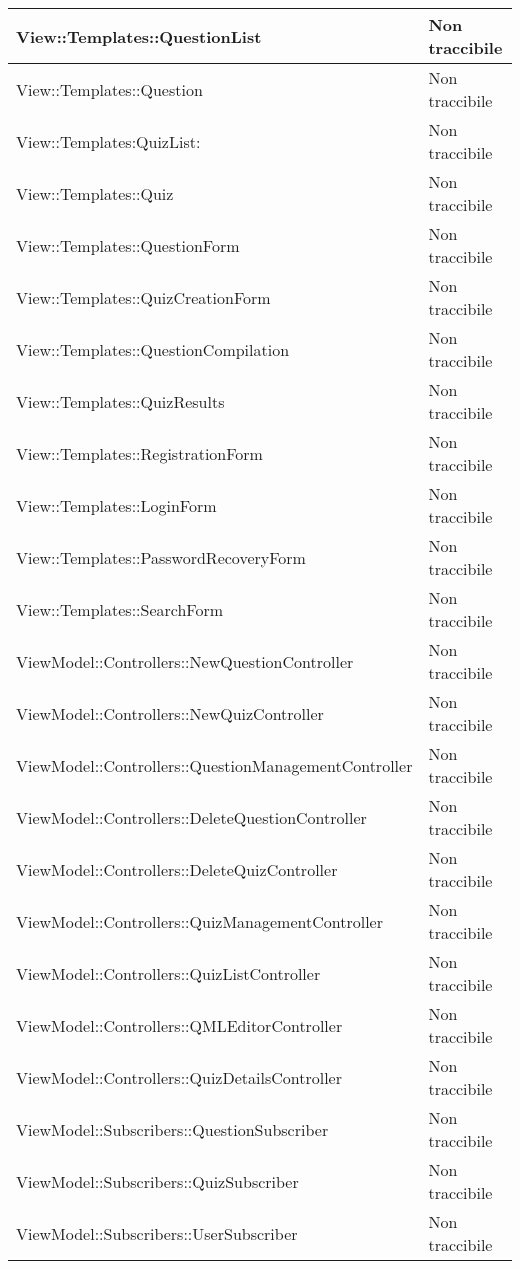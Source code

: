 \begin{longtable}{p{}p{}}
\midrule
View::Templates::QuestionList	& Non traccibile\\
\midrule
View::Templates::Question	& Non traccibile\\
\midrule
View::Templates:QuizList:	& Non traccibile\\
\midrule
View::Templates::Quiz	& Non traccibile\\
\midrule
View::Templates::QuestionForm	& Non traccibile\\
\midrule
View::Templates::QuizCreationForm	& Non traccibile\\
\midrule
View::Templates::QuestionCompilation	& Non traccibile\\
\midrule
View::Templates::QuizResults	& Non traccibile\\
\midrule
View::Templates::RegistrationForm	& Non traccibile\\
\midrule
View::Templates::LoginForm	& Non traccibile\\
\midrule
View::Templates::PasswordRecoveryForm	& Non traccibile\\
\midrule
View::Templates::SearchForm	& Non traccibile\\




\midrule
ViewModel::Controllers::NewQuestionController	& Non traccibile\\
\midrule
ViewModel::Controllers::NewQuizController	& Non traccibile\\
\midrule
ViewModel::Controllers::QuestionManagementController	& Non traccibile\\
\midrule
ViewModel::Controllers::DeleteQuestionController	& Non traccibile\\
\midrule
ViewModel::Controllers::DeleteQuizController	& Non traccibile\\
\midrule
ViewModel::Controllers::QuizManagementController	& Non traccibile\\
\midrule
ViewModel::Controllers::QuizListController	& Non traccibile\\
\midrule
ViewModel::Controllers::QMLEditorController	& Non traccibile\\
\midrule
ViewModel::Controllers::QuizDetailsController	& Non traccibile\\


\midrule
ViewModel::Subscribers::QuestionSubscriber	& Non traccibile\\
\midrule
ViewModel::Subscribers::QuizSubscriber	& Non traccibile\\
\midrule
ViewModel::Subscribers::UserSubscriber	& Non traccibile\\


\end{longtable}
